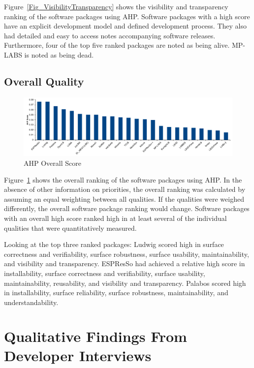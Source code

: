 \documentclass[final, 3p, times, authoryear]{elsarticle}
\begin{document}
Figure~\ref{Fig_VisibilityTransparency} shows the visibility and transparency
ranking of the software packages using AHP. Software packages with a high score
have an explicit development model and defined development process. They also
had detailed and easy to access notes accompanying software releases.
Furthermore, four of the top five ranked packages are noted as being alive.
MP-LABS is noted as being dead.

\subsection{Overall Quality}

\begin{figure}[h!]
	\centering
		\includegraphics[width=1.0\textwidth]{./figures/finalscore_chart.pdf}
		\caption{AHP Overall Score}
		\label{Fig_OverallScore}
\end{figure}

Figure~\ref{Fig_OverallScore} shows the overall ranking of the software packages
using AHP. In the absence of other information on priorities, the overall
ranking was calculated by assuming an equal weighting between all qualities. If the
qualities were weighed differently, the overall software package ranking would
change. Software packages with an overall high score ranked high in at least
several of the individual qualities that were quantitatively measured. 

Looking at the top three ranked packages: Ludwig scored high in surface
correctness and verifiability, surface robustness, surface usability,
maintainability, and visibility and transparency. ESPResSo had achieved a
relative high score in installability, surface correctness and verifiability,
surface usability, maintainability, reusability, and visibility and
transparency. Palabos scored high in installability, surface reliability,
surface robustness, maintainability, and understandability. 

\section{Qualitative Findings From Developer Interviews} \label{interviewresults}
\end{document}
